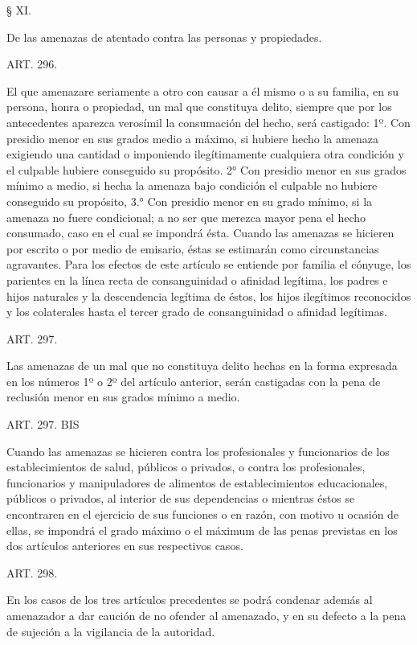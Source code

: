     § XI.

    De las amenazas de atentado contra las personas y propiedades.





    ART. 296.

    El que amenazare seriamente a otro con causar a él mismo o a su familia, en su persona, honra o propiedad, un mal que constituya delito, siempre que por los antecedentes aparezca verosímil la consumación del hecho, será castigado:
    1º. Con presidio menor en sus grados medio a máximo, si hubiere hecho la amenaza exigiendo una cantidad o imponiendo ilegítimamente cualquiera otra condición y el culpable hubiere conseguido su propósito.
    2° Con presidio menor en sus grados mínimo a medio, si hecha la amenaza bajo condición el culpable no hubiere conseguido su propósito,
    3.° Con presidio menor en su grado mínimo, si la amenaza no fuere condicional; a no ser que merezca mayor pena el hecho consumado, caso en el cual se impondrá ésta.
    Cuando las amenazas se hicieren por escrito o por medio de emisario, éstas se estimarán como circunstancias agravantes.
    Para los efectos de este artículo se entiende por familia el cónyuge, los parientes en la línea recta de consanguinidad o afinidad legítima, los padres e hijos naturales y la descendencia legítima de éstos, los hijos ilegítimos reconocidos y los colaterales hasta el tercer grado de consanguinidad o afinidad legítimas.



    ART. 297.

    Las amenazas de un mal que no constituya delito hechas en la forma expresada en los números 1º o 2º del artículo anterior, serán castigadas con la pena de reclusión menor en sus grados mínimo a medio.



    ART. 297. BIS

    Cuando las amenazas se hicieren contra los profesionales y funcionarios de los establecimientos de salud, públicos o privados, o contra los profesionales, funcionarios y manipuladores de alimentos de establecimientos educacionales, públicos o privados, al interior de sus dependencias o mientras éstos se encontraren en el ejercicio de sus funciones o en razón, con motivo u ocasión de ellas, se impondrá el grado máximo o el máximum de las penas previstas en los dos artículos anteriores en sus respectivos casos.


    ART. 298.

    En los casos de los tres artículos precedentes se podrá condenar además al amenazador a dar caución de no ofender al amenazado, y en su defecto a la pena de sujeción a la vigilancia de la autoridad.




